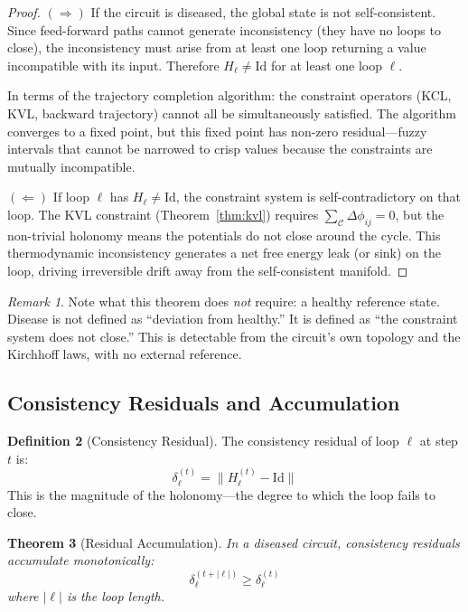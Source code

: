 \documentclass[10pt,twocolumn,a4paper]{article}
\theoremstyle{plain}
\newtheorem{theorem}{Theorem}[section]
\theoremstyle{definition}
\newtheorem{definition}[theorem]{Definition}
\theoremstyle{remark}
\newtheorem{remark}[theorem]{Remark}
\begin{document}
\begin{proof}
$(\Rightarrow)$ If the circuit is diseased, the global state is not self-consistent. Since feed-forward paths cannot generate inconsistency (they have no loops to close), the inconsistency must arise from at least one loop returning a value incompatible with its input. Therefore $H_\ell \neq \mathrm{Id}$ for at least one loop $\ell$.

In terms of the trajectory completion algorithm: the constraint operators (KCL, KVL, backward trajectory) cannot all be simultaneously satisfied. The algorithm converges to a fixed point, but this fixed point has non-zero residual---fuzzy intervals that cannot be narrowed to crisp values because the constraints are mutually incompatible.

$(\Leftarrow)$ If loop $\ell$ has $H_\ell \neq \mathrm{Id}$, the constraint system is self-contradictory on that loop. The KVL constraint (Theorem~\ref{thm:kvl}) requires $\sum_{\mathcal{C}} \Delta\phi_{ij} = 0$, but the non-trivial holonomy means the potentials do not close around the cycle. This thermodynamic inconsistency generates a net free energy leak (or sink) on the loop, driving irreversible drift away from the self-consistent manifold.
\end{proof}

\begin{remark}
Note what this theorem does \emph{not} require: a healthy reference state. Disease is not defined as ``deviation from healthy.'' It is defined as ``the constraint system does not close.'' This is detectable from the circuit's own topology and the Kirchhoff laws, with no external reference.
\end{remark}

\subsection{Consistency Residuals and Accumulation}

\begin{definition}[Consistency Residual]
\label{def:residual}
The consistency residual of loop $\ell$ at step $t$ is:
\begin{equation}
    \delta_\ell^{(t)} = \|H_\ell^{(t)} - \mathrm{Id}\|
\end{equation}
This is the magnitude of the holonomy---the degree to which the loop fails to close.
\end{definition}

\begin{theorem}[Residual Accumulation]
\label{thm:accumulation}
In a diseased circuit, consistency residuals accumulate monotonically:
\begin{equation}
    \delta_\ell^{(t+|\ell|)} \geq \delta_\ell^{(t)}
\end{equation}
where $|\ell|$ is the loop length.
\end{theorem}
\end{document}
